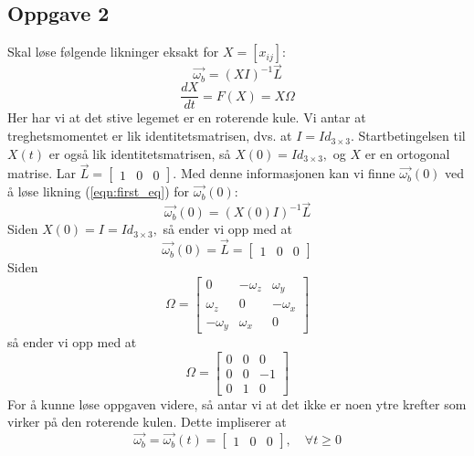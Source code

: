 \subsection{Oppgave 2}
Skal løse følgende likninger eksakt for $X=[x_{ij}]:$
\begin{equation}
\label{eqn:first_eq}
    \vec{\omega_b}=(XI)^{-1}\vec{L}
\end{equation}
\begin{equation}
\label{eqn:second_eq}
    \frac{dX}{dt}=F(X)=X\Omega
\end{equation} 
Her har vi at det stive legemet er en roterende kule. Vi antar at treghetsmomentet er lik identitetsmatrisen, dvs. at $I=Id_{3\times3}.$ Startbetingelsen til $X(t)$ er også lik identitetsmatrisen, så $X(0)=Id_{3\times3},$ og $X$ er en ortogonal matrise. Lar $\vec{L}=\begin{bmatrix}1&0&0\end{bmatrix}.$\newline\newline
Med denne informasjonen kan vi finne $\vec{\omega_b}(0)$ ved å løse likning (\ref{eqn:first_eq}) for $\vec{\omega_b}(0):$
\begin{equation}
    \vec{\omega_b}(0)=(X(0)I)^{-1}\vec{L}
\end{equation}
Siden $X(0)=I=Id_{3\times3},$ så ender vi opp med at
\begin{equation}
    \vec{\omega_b}(0)=\vec{L}=\begin{bmatrix}1&0&0\end{bmatrix}
\end{equation}
Siden
\begin{equation}
    \Omega=\begin{bmatrix}0&-\omega_z&\omega_y\\\omega_z&0&-\omega_x\\-\omega_y&\omega_x&0\end{bmatrix}
\end{equation}
så ender vi opp med at 
\begin{equation}
    \Omega=\begin{bmatrix}0&0&0\\0&0&-1\\0&1&0\end{bmatrix}
\end{equation}
For å kunne løse oppgaven videre, så antar vi at det ikke er noen ytre krefter som virker på den roterende kulen. Dette impliserer at
\begin{equation}
\label{eqn:konstant}
    \vec{\omega_b}=\vec{\omega_b}(t)=\begin{bmatrix}1&0&0\end{bmatrix},\quad\forall t\geq0
\end{equation}
